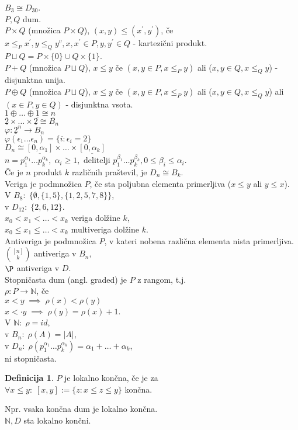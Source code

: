 \documentclass[a4paper, 12pt]{book}
\theoremstyle{definition}
\newtheorem{defn}[counter]{Definicija}
\theoremstyle{remark}
\newcommand{\N}{\mathbb{N}}
\begin{document}
$B_3 \cong D_{30}$. \\
$P, Q$ dum. \\
$P \times Q$ (množica $P \times Q$), $(x,y) \leq (x^{'},y^{'})$, če $x \leq_P x^{'},
y \leq_Q y^v, x, x^{'} \in P, y, y^{'} \in Q$ - kartezični produkt. \\
$P \sqcup Q = P \times \{0\} \cup Q \times \{1\}$. \\
$P + Q$ (množica $P \sqcup Q$), $x \leq y$ če $(x,y \in P, x \leq_P y)$ ali ($x,y \in Q, x \leq_Q y$)
- disjunktna unija. \\
$P \oplus Q$ (množica $P \sqcup Q$), $x \leq y$ če $(x,y \in P, x \leq_P y)$ ali ($x,y \in Q, x \leq_Q y$)
ali $(x \in P, y \in Q)$ - disjunktna vsota. \\
$\underline{1} \oplus \dots \oplus \underline{1} \cong \underline{n}$ \\
$\underline{2} \times \dots \times \underline{2} \cong B_n$ \\
$\varphi: \underline{2}^n \to B_n$ \\
$\varphi(\epsilon_1 \dots \epsilon_n) = \{i: \epsilon_i = 2\}$ \\
$D_n \cong \underline{[0, \alpha_1]} \times \dots \times \underline{[0, \alpha_k]}$ \\
$n = p_1^{\alpha_1} \dots p_k^{\alpha_k}, \; \alpha_i \geq 1,$ delitelji
$p_1^{\beta_1} \dots p_k^{\beta_k}, 0 \leq \beta_i \leq \alpha_i$. \\
Če je $n$ produkt $k$ različnih praštevil, je $D_n \cong B_k$. \\
Veriga je podmnožica $P$, če sta poljubna elementa primerljiva ($x \leq y$ ali $y \leq x$). \\
V $B_8: \; \{\emptyset, \{1, 5\}, \{1, 2, 5, 7, 8\}\}$, \\
v $D_12: \; \{2, 6, 12\}$. \\
$x_0 < x_1 < \dots < x_k$ veriga dolžine $k$, \\
$x_0 \leq x_1 \leq \dots < x_k$ multiveriga dolžine $k$. \\
Antiveriga je podmnožica $P$, v kateri nobena različna elementa nista primerljiva. \\
$\binom{[n]}{k}$ antiveriga v $B_n$, \\
$\P$ antiveriga v $D$. \\
Stopničasta dum (angl. graded) je $P$ z rangom, t.j. \\
$\rho: P \to \N$, če \\
$x < y \; \implies \; \rho(x) < \rho(y)$ \\
$x <\cdot y \; \implies \; \rho(y) = \rho(x) + 1$. \\
V $\N: \; \rho = id$, \\
v $B_n: \; \rho(A) = |A|$, \\
v $D_n: \; \rho\left(p_1^{\alpha_1} \dots p_k^{\alpha_k}\right) = \alpha_1 + \dots + \alpha_k$, \\
ni stopničasta.
\begin{defn}
  $P$ je lokalno končna, če je za \\
  $\forall x \leq y: \; [x,y] := \{z: x \leq z \leq y\}$ končna.
\end{defn}
Npr. vsaka končna dum je lokalno končna. \\
$\N, D$ sta lokalno končni.
\end{document}
